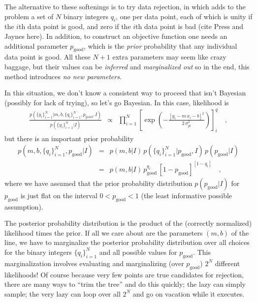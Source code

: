 \documentclass[12pt]{article}
\newcounter{problem}
\newcommand{\setofall}[3]{\{{#1}\}_{{#2}}^{{#3}}}
\newcommand{\allq}{\setofall{q_i}{i=1}{N}}
\newcommand{\ally}{\setofall{y_i}{i=1}{N}}
\newcommand{\pgood}{p_{\mathrm{good}}}
\begin{document}
The alternative to these softenings is to try data rejection, in which
adds to the problem a set of $N$ binary integers $q_i$, one per data
point, each of which is unity if the $i$th data point is good, and
zero if the $i$th data point is bad (cite Press and Jaynes here).  In
addition, to construct an objective function one needs an additional
parameter $\pgood$, which is the \emph{prior} probability that any
individual data point is good.  All these $N+1$ extra parameters may
seem like crazy baggage, but their values can be \emph{inferred} and
\emph{marginalized out} so in the end, this method introduces \emph{no
  new parameters}.

In this situation, we don't know a consistent way to proceed that isn't
Bayesian (possibly for lack of trying), so let's go Bayesian.  In this
case, likelihood is
\begin{eqnarray}\displaystyle
\frac{p(\ally|m,b,\allq,\pgood,I)}{p(\ally|I)}
 &\propto& \prod_{i=1}^N \left[\exp\left(-\frac{[y_i-m\,x_i-b]^2}{2\,\sigma_{yi}^2}\right)\right]^q_i \quad ,
\end{eqnarray}
but there is an important prior probability
\begin{eqnarray}\displaystyle
p(m,b,\allq,\pgood|I)
 &=& p(m,b|I)\,p(\allq|\pgood,I)\,p(\pgood|I) \nonumber \\
 &=& p(m,b|I)\,\pgood^{q_i}\,[1-\pgood]^{[1-q_i]} \quad ,
\end{eqnarray}
where we have assumed that the prior probability distribution
$p(\pgood|I)$ for $\pgood$ is just flat on the interval $0<\pgood<1$
(the least informative possible assumption).

The posterior probability distribution is the product of the
(correctly normalized) likelihood times the prior.  If all we care
about are the parameters $(m,b)$ of the line, we have to marginalize
the posterior probability distribution over all choices for the binary
integers $\allq$ and all possible values for $\pgood$.  This
marginalization involves evaluating and marginalizing (over $\pgood$)
$2^N$ different likelihoods!  Of course because very few points are
true candidates for rejection, there are many ways to ``trim the
tree'' and do this quickly; the lazy can simply sample; the very lazy
can loop over all $2^N$ and go on vacation while it executes.
\end{document}
